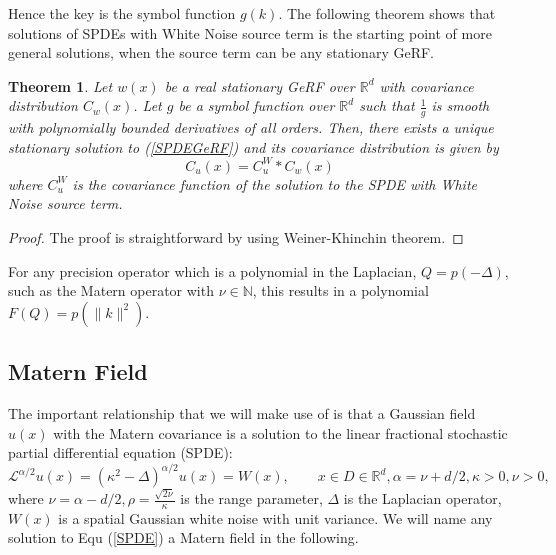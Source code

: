 \documentclass{article}
\newtheorem{theorem}{Theorem}
\begin{document}
Hence the key is the symbol function $g(k)$.
The following theorem shows that solutions of SPDEs with White Noise source term is the starting point of more general solutions, when the source term can be any stationary GeRF.
\begin{theorem}\label{uniquenessandexistence}
	Let $w(x)$ be a real stationary GeRF over $\mathbb{R}^d$ with covariance distribution $C_w(x)$. 
	Let $g$ be a symbol function over $\mathbb{R}^d$ such that $\frac{1}{g}$ is smooth with polynomially bounded derivatives of all orders. 
	Then, there exists a unique stationary solution to (\ref{SPDEGeRF}) and its covariance distribution is given by
\begin{equation}
	C_u(x) = C_u^W * C_w(x)
\end{equation}
where $C_u^W$ is the covariance function of the solution to the SPDE with White Noise source term.
\end{theorem}
\begin{proof}
	The proof is straightforward by using Weiner-Khinchin theorem.
\end{proof}
For any precision operator which is a polynomial in the Laplacian, $Q = p(-\Delta)$, such as the Matern operator with $\nu \in \mathbb{N}$, 
this results in a polynomial $F(Q) = p(\|k\|^2)$.
\subsection{Matern Field}
The important relationship that we will make use of is that a Gaussian field $u(x)$ with the Matern covariance is 
a solution to the linear fractional stochastic partial differential equation (SPDE):
\begin{equation}\label{SPDE}
	\mathcal{L}^{\alpha/2}u(x) = (\kappa^2 - \Delta)^{\alpha/2} u(x) = W(x), \qquad x\in D\in \mathbb{R}^d, \alpha=\nu + d/2, \kappa>0, \nu>0,
\end{equation}
where $\nu = \alpha - d/2, \rho = \frac{\sqrt{2\nu}}{\kappa}$ is the range parameter, $\Delta$ is the Laplacian operator, $W(x)$ is a spatial Gaussian white noise with unit variance.
We will name any solution to Equ (\ref{SPDE}) a Matern field in the following. 
\end{document}
